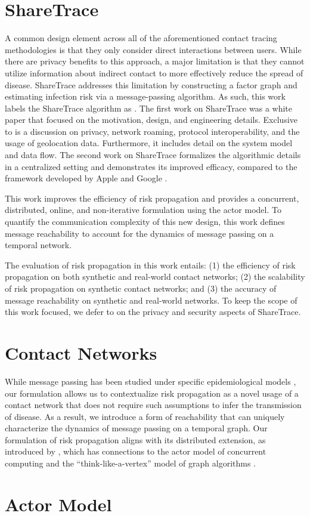 \section{ShareTrace}

A common design element across all of the aforementioned contact tracing methodologies is that they only consider direct interactions between users. While there are privacy benefits to this approach, a major limitation is that they cannot utilize information about indirect contact to more effectively reduce the spread of disease. ShareTrace addresses this limitation by constructing a factor graph and estimating infection risk via a message-passing algorithm. As such, this work labels the ShareTrace algorithm as . The first work on ShareTrace was a white paper that focused on the motivation, design, and engineering details. Exclusive to \cite{Ayday2020} is a discussion on privacy, network roaming, protocol interoperability, and the usage of geolocation data. Furthermore, it includes detail on the system model and data flow. The second work on ShareTrace \cite{Ayday2021} formalizes the algorithmic details in a centralized setting and demonstrates its improved efficacy, compared to the framework developed by Apple and Google \cite{AppleGoogle}.

This work improves the efficiency of risk propagation and provides a concurrent, distributed, online, and non-iterative formulation using the actor model. To quantify the communication complexity of this new design, this work defines message reachability to account for the dynamics of message passing on a temporal network. 

The evaluation of risk propagation in this work entails: (1) the efficiency of risk propagation on both synthetic and real-world contact networks; (2) the scalability of risk propagation on synthetic contact networks; and (3) the accuracy of message reachability on synthetic and real-world networks. To keep the scope of this work focused, we defer to \cite{Ayday2021} on the privacy and security aspects of ShareTrace.

\section{Contact Networks}

While message passing has been studied under specific epidemiological models \cite{Karrer2010, Li2021}, our formulation allows us to contextualize risk propagation as a novel usage of a contact network that does not require such assumptions to infer the transmission of disease. As a result, we introduce a form of reachability that can uniquely characterize the dynamics of message passing on a temporal graph. Our formulation of risk propagation aligns with its distributed extension, as introduced by \cite{Ayday2021}, which has connections to the actor model of concurrent computing \cite{Baker1977, Agha1986} and the ``think-like-a-vertex'' model of graph algorithms \cite{McCune2015}.

\section{Actor Model}
